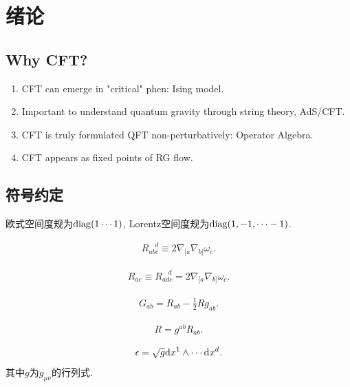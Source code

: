 \section{绪论}
\subsection{Why CFT?}
\begin{enumerate}
    \item CFT can emerge in "critical" phen: Ising model.
    \item Important to understand quantum gravity through string theory, AdS/CFT.
    \item CFT is truly formulated QFT non-perturbatively: Operator Algebra.
    \item CFT appears as fixed points of RG flow.
\end{enumerate}
\subsection{符号约定}
欧式空间度规为$\mathrm{diag}(1\cdots1)$, Lorentz空间度规为$\mathrm{diag}(1, -1, \cdots-1)$.
\begin{definition}[Riemann曲率张量]
    \begin{align}
        R_{abc}^{~~~~d}\equiv2\nabla_{[a}\nabla_{b]}\omega_c.
    \end{align}
\end{definition}
\begin{definition}[Ricci张量]
    \begin{align}
        R_{ac}\equiv R_{adc}^{~~~~d}=2\nabla_{[a}\nabla_{b]}\omega_c.
    \end{align}
\end{definition}
\begin{definition}[Einstein场张量]
    \begin{align}
        G_{ab}=R_{ab}-\frac12 Rg_{ab}.
    \end{align}
\end{definition}
\begin{definition}[标量曲率]
    \begin{align}
        R=g^{ab}R_{ab}.
    \end{align}
\end{definition}
\begin{definition}[体元测度]
    \begin{align}
        \epsilon=\sqrt{g}\mathrm d x^1\wedge\cdots\mathrm d x^d.
    \end{align}
    其中$g$为$g_{\mu\nu}$的行列式.
\end{definition}

